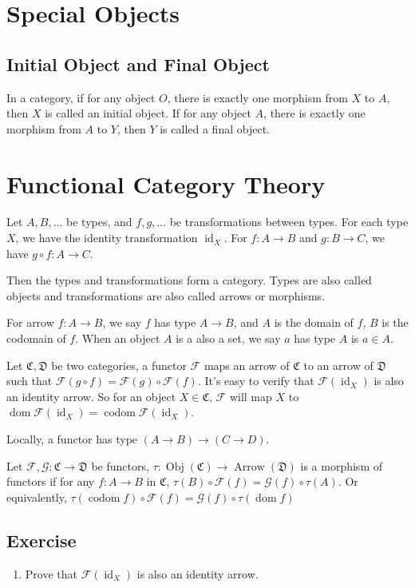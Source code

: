 \documentclass{article}
\newcommand{\id}{\mathop{\mathrm{id}}}
\newcommand{\dom}{\mathop{\mathrm{dom}}}
\newcommand{\codom}{\mathop{\mathrm{codom}}}
\newcommand{\obj}{\mathop{\mathrm{Obj}}}
\newcommand{\arrow}{\mathop{\mathrm{Arrow}}}
\begin{document}
\section{Special Objects}
\subsection{Initial Object and Final Object}
In a category, if for any object $O$, there is exactly one
morphism from $X$ to $A$, then $X$ is called an initial object.
If for any object $A$, there is exactly one morphism from $A$ to $Y$,
then $Y$ is called a final object.


\section{Functional Category Theory}
Let $A, B, \dots$ be types, and $f, g, \dots$ be transformations between types.
For each type $X$, we have the identity transformation $\id_X$.
For $f : A \to B$ and $g : B \to C$, we have $g \circ f : A \to C$.

Then the types and transformations form a category.
Types are also called objects and transformations are also called arrows or morphisms.

For arrow $f : A \to B$, we say $f$ has type $A \to B$,
and $A$ is the domain of $f$, $B$ is the codomain of $f$.
When an object $A$ is a also a set, we say $a$ has type $A$ is $a \in A$.

Let $\mathfrak{C}, \mathfrak{D}$ be two categories, a functor $\mathcal{F}$
maps an arrow of $\mathfrak{C}$ to an arrow of $\mathfrak{D}$
such that $\mathcal{F}(g \circ f) = \mathcal{F}(g) \circ \mathcal{F}(f)$.
It's easy to verify that $\mathcal{F}(\id_X)$ is also an identity arrow.
So for an object $X \in \mathfrak{C}$, $\mathcal{F}$ will map $X$ to
$\dom \mathcal{F}(\id_X) = \codom \mathcal{F}(\id_X)$.

Locally, a functor has type $(A \to B) \to (C \to D)$.

Let $\mathcal{F}, \mathcal{G} : \mathfrak{C} \to \mathfrak{D}$ be functors,
$\tau : \obj(\mathfrak{C}) \to \arrow(\mathfrak{D})$ is a morphism of functors if
for any $f : A \to B$ in $\mathfrak{C}$, $\tau(B) \circ \mathcal{F}(f) = \mathcal{G}(f) \circ \tau(A)$.
Or equivalently, $\tau(\codom f) \circ \mathcal{F}(f) = \mathcal{G}(f) \circ \tau(\dom f)$

\subsection*{Exercise}
\begin{enumerate}[1.]
\item Prove that $\mathcal{F}(\id_X)$ is also an identity arrow.
\end{enumerate}
\end{document}
